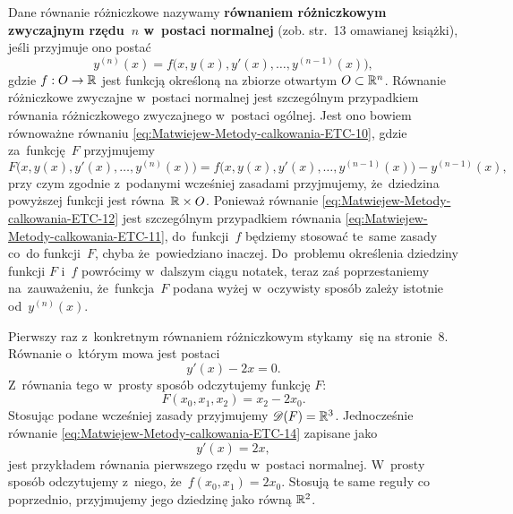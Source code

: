 \documentclass[a4paper,11pt]{article}
\numberwithin{equation}{section}
\begin{document}
Dane równanie różniczkowe nazywamy \textbf{równaniem różniczkowym
  zwyczajnym rzędu~$n$ w~postaci normalnej} (zob. str.~13 omawianej
książki), jeśli przyjmuje ono postać
\begin{equation}
  \label{eq:Matwiejew-Metody-calkowania-ETC-12}
  y^{ ( n ) }( x ) = f\big( x, y( x ), y'( x ), \ldots, y^{ ( n - 1 ) }( x ) \big),
\end{equation}
gdzie $f : O \to \mathbb{R}$ jest funkcją określoną na zbiorze otwartym
$O \subset \mathbb{R}^{ n }$. Równanie różniczkowe zwyczajne w~postaci normalnej jest
szczególnym przypadkiem równania różniczkowego zwyczajnego w~postaci
ogólnej. Jest ono bowiem równoważne równaniu
\eqref{eq:Matwiejew-Metody-calkowania-ETC-10}, gdzie za~funkcję~$F$
przyjmujemy
\begin{equation}
  \label{eq:Matwiejew-Metody-calkowania-ETC-13}
  F\big( x, y( x ), y'( x ), \ldots, y^{ ( n ) }( x ) \big) =
  f\big( x, y( x ), y'( x ), \ldots, y^{ ( n - 1 ) }( x ) \big) -
  y^{ ( n - 1 ) }( x ),
\end{equation}
przy czym zgodnie z~podanymi wcześniej zasadami przyjmujemy, że~dziedzina
powyższej funkcji jest równa~$\mathbb{R} \times O$. Ponieważ równanie
\eqref{eq:Matwiejew-Metody-calkowania-ETC-12} jest szczególnym przypadkiem
równania \eqref{eq:Matwiejew-Metody-calkowania-ETC-11}, do~funkcji~$f$
będziemy stosować te~same zasady co~do funkcji~$F$, chyba że~powiedziano
inaczej. Do~problemu określenia dziedziny funkcji $F$ i~$f$ powrócimy
w~dalszym ciągu notatek, teraz zaś poprzestaniemy na~zauważeniu,
że~funkcja~$F$ podana wyżej w~oczywisty sposób zależy istotnie
od~$y^{ ( n ) }( x )$.

Pierwszy raz z~konkretnym równaniem różniczkowym stykamy~się na stronie~8.
Równanie o~którym mowa jest postaci
\begin{equation}
  \label{eq:Matwiejew-Metody-calkowania-ETC-14}
  y'( x ) - 2 x = 0.
\end{equation}
Z~równania tego w~prosty sposób odczytujemy funkcję $F$:
\begin{equation}
  \label{eq:Matwiejew-Metody-calkowania-ETC-15}
  F( x_{ 0 }, x_{ 1 }, x_{ 2 } ) = x_{ 2 } - 2 x_{ 0 }.
\end{equation}
Stosując podane wcześniej zasady przyjmujemy $\mathcal{D}( F ) = \mathbb{R}^{ 3 }$.
Jednocześnie równanie \eqref{eq:Matwiejew-Metody-calkowania-ETC-14} zapisane
jako
\begin{equation}
  \label{eq:Matwiejew-Metody-calkowania-ETC-16}
  y'( x ) = 2 x,
\end{equation}
jest przykładem równania pierwszego rzędu w~postaci normalnej. W~prosty
sposób odczytujemy z~niego, że~$f( x_{ 0 }, x_{ 1 } ) = 2 x_{ 0 }$. Stosują
te same reguły co poprzednio, przyjmujemy jego dziedzinę jako równą
$\mathbb{R}^{ 2 }$.
\end{document}
